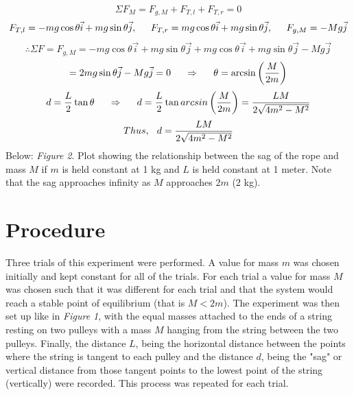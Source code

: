 \documentclass[12pt,letterpaper]{article}
\begin{document}
\begin{equation}
\Sigma F_M = F_{g,M} + F_{T,l} + F_{T,r} = 0
\end{equation}
\begin{equation}
F_{T,l} =  -mg\cos\theta \vec{i} +mg\sin\theta \vec{j}, \hspace{.2in} F_{T,r} =  mg\cos\theta \vec{i} +mg\sin\theta \vec{j}, \hspace{.2in} F_{g,M}=-Mg\vec{j}
\end{equation}
\begin{equation}
\therefore \Sigma F = F_{g,M}= -mg\cos\theta \vec{i} +mg\sin\theta \vec{j} + mg\cos\theta \vec{i} +mg\sin\theta \vec{j} - Mg\vec{j}
\end{equation}
\begin{equation}
=2mg\sin\theta \vec{j} - Mg\vec{j} = 0 \hspace{.2in} \Rightarrow \hspace{.2in} \theta = \arcsin\left(\frac{M}{2m}\right)
\end{equation}
\begin{equation}
d = \frac{L}{2}\tan\theta \hspace{.2in} \Rightarrow \hspace{.2in} d =  \frac{L}{2}\tan\\arcsin\left(\frac{M}{2m}\right) = \frac{L M}{2\sqrt{4m^2 - M^2}}
\end{equation}
\begin{equation}
Thus,\hspace{0.1in} d = \frac{L M}{2\sqrt{4m^2 - M^2}}
\end{equation}
\newline
Below: \textit{Figure 2}. Plot showing the relationship between the sag of the rope and mass \(M\) if \(m\) is held constant at 1 kg and \(L\) is held constant at 1 meter. Note that the sag approaches infinity as \(M\) approaches 2\(m\) (2 kg).

\begin {figure}[htb!]
  \begin{center}
    	\resizebox{0.49\textwidth}{!}{}
  \end	{center}
\end {figure}

\pagebreak  
\section{Procedure}
Three trials of this experiment were performed. A value for mass \(m\) was chosen initially and kept constant for all of the trials. For each trial a value for mass \(M\) was chosen such that it was different for each trial and that the system would reach a stable point of equilibrium (that is \(M<2m\)). The experiment was then set up like in \textit{Figure 1}, with the equal masses attached to the ends of a string resting on two pulleys with a mass \(M\) hanging from the string between the two pulleys. Finally, the distance \(L\), being the horizontal distance between the points where the string is tangent to each pulley and the distance \(d\), being the "sag" or vertical distance from those tangent points to the lowest point of the string (vertically) were recorded. This process was repeated for each trial.
\end{document}
